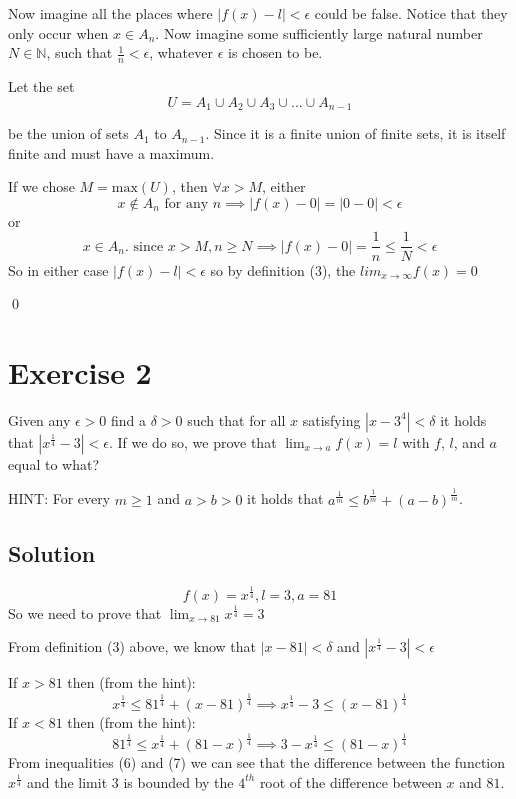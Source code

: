 \documentclass{article}
\begin{document}
Now imagine all the places where $|f(x)-l|< \epsilon$ could be false. Notice that they only occur when
$x \in A_n$. Now imagine some sufficiently large natural number $N \in \mathbb{N}$, such that
$\frac1n < \epsilon$, whatever $\epsilon$ is chosen to be.

Let the set
\begin{equation}
	U=A_1 \cup A_2 \cup A_3 \cup ... \cup A_{n-1}
\end{equation}

be the union of sets $A_1$ to $A_{n-1}$. Since it is a finite union of finite sets, it is itself finite
and must have a maximum.

If we chose $M=\text{max}(U)$, then $\forall x > M$, either
\begin{equation*}
	x \notin A_n \text{ for any } n
	\implies |f(x)-0| = |0-0| < \epsilon
\end{equation*}
or
\begin{equation*}
	x \in A_n. \text{ since } x>M, n \ge N \implies |f(x)-0| = \frac1n \le \frac1N < \epsilon
\end{equation*}
So in either case $|f(x)-l|< \epsilon$ so by definition (3), the $lim_{x \to \infty} f(x) = 0$

\qed

\section{Exercise 2}

Given any $\epsilon > 0$ find a $\delta > 0$ such that for all $x$ satisfying $|x-3^4|<\delta$ it holds that
$|x^{\frac14}-3|<\epsilon$. If we do so, we prove that $\lim_{x \to a}f(x)=l$ with $f$, $l$, and $a$ equal to
what?

HINT: For every $m \ge 1$ and $a>b>0$ it holds that $a^{\frac1m} \le b^{\frac1m}+(a-b)^{\frac1m}$.

\subsection{Solution}
\begin{equation}
	f(x)=x^{\frac14}, l=3, a=81
\end{equation}
So we need to prove that $\lim_{x \to 81}x^{\frac14}=3$

From definition (3) above, we know that $|x-81|< \delta$ and $|x^{\frac14}-3|< \epsilon$

If $x>81$ then (from the hint):
\begin{equation}
	x^{\frac14} \le 81^{\frac14}+(x-81)^{\frac14} \implies x^{\frac14}-3 \le (x-81)^{\frac14}
\end{equation}
If $x<81$ then (from the hint):
\begin{equation}
	81^{\frac14} \le x^{\frac14} + (81-x)^{\frac14} \implies 3-x^{\frac14} \le (81-x)^{\frac14}
\end{equation}
From inequalities (6) and (7) we can see that the difference between the function $x^{\frac14}$ and the limit $3$
is bounded by the $4^{th}$ root of the difference between $x$ and $81$.
\end{document}
